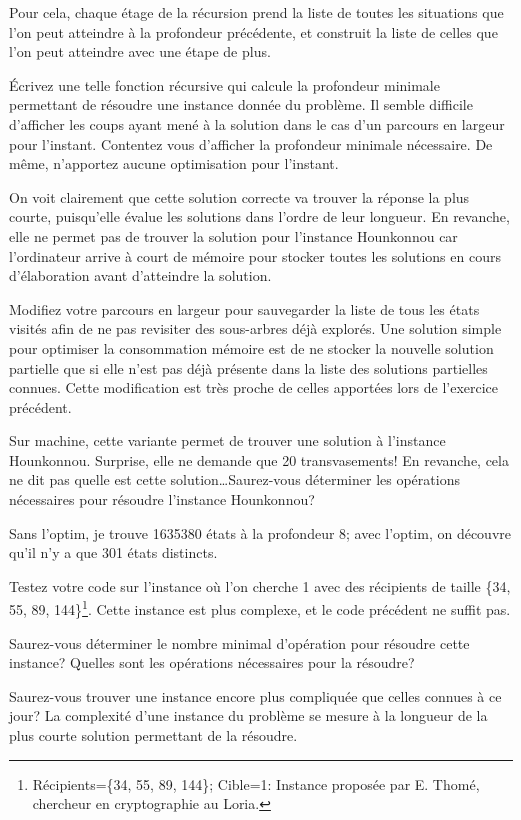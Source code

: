 \documentclass[10pt]{article}\usepackage[nu]{esial}%
\begin{document}
\begin{Exercice}
Pour cela, chaque étage de la récursion prend la liste de toutes les situations
que l'on peut atteindre à la profondeur précédente, et construit la liste de
celles que l'on peut atteindre avec une étape de plus.

\Question Écrivez une telle fonction récursive qui calcule la profondeur
minimale permettant de résoudre une instance donnée du problème. Il semble
difficile d'afficher les coups ayant mené à la solution dans le cas d'un
parcours en largeur pour l'instant. Contentez vous d'afficher la profondeur
minimale nécessaire. De même, n'apportez aucune optimisation pour l'instant.

\begin{Reponse}
  \newcommand*\FancyVerbStartString{// BEGIN CHERCHE}
  \newcommand*\FancyVerbStopString{// END CHERCHE}
\end{Reponse}

\Question %
On voit clairement que cette solution correcte va trouver la réponse la plus
courte, puisqu'elle évalue les solutions dans l'ordre de leur longueur. En
revanche, elle ne permet pas de trouver la solution pour l'instance Hounkonnou
car l'ordinateur arrive à court de mémoire pour stocker toutes les solutions en
cours d'élaboration avant d'atteindre la solution.

\Question %
Modifiez votre parcours en largeur pour sauvegarder la liste de tous les états
visités afin de ne pas revisiter des sous-arbres déjà explorés. 
Une solution simple pour optimiser la consommation mémoire est de ne stocker la
nouvelle solution partielle que si elle n'est pas déjà présente dans la liste
des solutions partielles connues. Cette modification est très proche de celles
apportées lors de l'exercice précédent.

Sur machine, cette variante permet de trouver une solution à l'instance
Hounkonnou. Surprise, elle ne demande que 20 transvasements! En revanche, cela
ne dit pas quelle est cette solution\ldots Saurez-vous déterminer les opérations
nécessaires pour résoudre l'instance Hounkonnou?

\begin{Reponse}
  Sans l'optim, je trouve 1635380 états à la profondeur 8; avec l'optim, on
  découvre qu'il n'y a que 301 états distincts.
\end{Reponse}

\Question %
Testez votre code sur l'instance où l'on cherche 1 avec des récipients de taille
\{34, 55, 89, 144\}\footnote{Récipients=\{34, 55, 89, 144\}; Cible=1: Instance
  proposée par E. Thomé, chercheur en cryptographie au Loria.}. Cette instance
est plus complexe, et le code précédent ne suffit pas.

Saurez-vous déterminer le nombre minimal d'opération pour résoudre cette
instance? Quelles sont les opérations nécessaires pour la résoudre?

\Question %
Saurez-vous trouver une instance encore plus compliquée que celles connues à ce
jour? La complexité d'une instance du problème se mesure à la longueur de la
plus courte solution permettant de la résoudre.
\end{Exercice}
\end{document}
